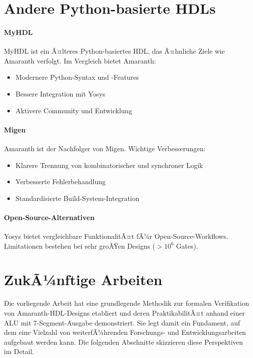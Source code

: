 ﻿\documentclass[12pt,a4paper]{report}
\begin{document}
\section{Andere Python-basierte HDLs}

\paragraph{MyHDL}
MyHDL \cite{myhdl2024} ist ein Ã¤lteres Python-basiertes HDL, das Ã¤hnliche Ziele wie Amaranth verfolgt. Im Vergleich bietet Amaranth:
\begin{itemize}
	\item Modernere Python-Syntax und -Features
	\item Bessere Integration mit Yosys
	\item Aktivere Community und Entwicklung
\end{itemize}

\paragraph{Migen}
Amaranth ist der Nachfolger von Migen. Wichtige Verbesserungen:
\begin{itemize}
	\item Klarere Trennung von kombinatorischer und synchroner Logik
	\item Verbesserte Fehlerbehandlung
	\item Standardisierte Build-System-Integration
\end{itemize}

\paragraph{Open-Source-Alternativen}
Yosys bietet vergleichbare FunktionalitÃ¤t fÃ¼r Open-Source-Workflows. Limitationen bestehen bei sehr groÃŸen Designs ($> 10^6$ Gates).

\section{ZukÃ¼nftige Arbeiten}

Die vorliegende Arbeit hat eine grundlegende Methodik zur formalen Verifikation von
Amaranth-HDL-Designs etabliert und deren PraktikabilitÃ¤t anhand einer ALU mit
7-Segment-Ausgabe demonstriert. Sie legt damit ein Fundament, auf dem eine Vielzahl von
weiterfÃ¼hrenden Forschungs- und Entwicklungsarbeiten aufgebaut werden kann. Die
folgenden Abschnitte skizzieren diese Perspektiven im Detail.
\end{document}
